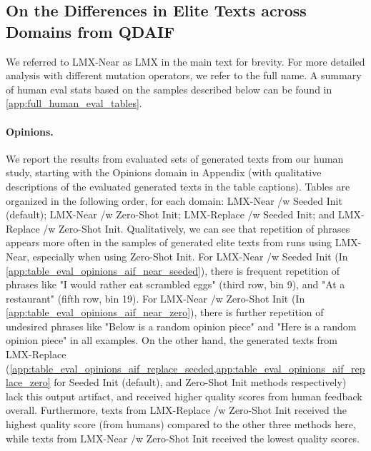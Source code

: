 

\clearpage
\newpage
\subsection{On the Differences in Elite Texts across Domains from QDAIF}\label{app:qualitative_summary_qdaif}
We referred to LMX-Near \citep{meyerson2023language} as LMX in the main text for brevity. For more detailed analysis with different mutation operators, we refer to the full name. A summary of human eval stats based on the samples described below can be found in \cref{app:full_human_eval_tables}.

\paragraph{Opinions.}
We report the results from evaluated sets of generated texts from our human study, starting with the Opinions domain in Appendix  (with qualitative descriptions of the evaluated generated texts in the table captions). Tables are organized in the following order, for each domain: LMX-Near /w Seeded Init (default); LMX-Near /w Zero-Shot Init; LMX-Replace /w Seeded Init; and LMX-Replace /w Zero-Shot Init. Qualitatively, we can see that repetition of phrases appears more often in the samples of generated elite texts from runs using LMX-Near, especially when using Zero-Shot Init. For LMX-Near /w Seeded Init (In \cref{app:table_eval_opinions_aif_near_seeded}), there is frequent repetition of phrases like "I would rather eat scrambled eggs" (third row, bin 9), and "At a restaurant" (fifth row, bin 19). For LMX-Near /w Zero-Shot Init (In \cref{app:table_eval_opinions_aif_near_zero}), there is further repetition of undesired phrases like "Below is a random opinion piece" and "Here is a random opinion piece" in all examples. On the other hand, the generated texts from LMX-Replace (\cref{app:table_eval_opinions_aif_replace_seeded,app:table_eval_opinions_aif_replace_zero} for Seeded Init (default), and Zero-Shot Init methods respectively) lack this output artifact, and received higher quality scores from human feedback overall. Furthermore, texts from LMX-Replace /w Zero-Shot Init received the highest quality score (from humans) compared to the other three methods here, while texts from LMX-Near /w Zero-Shot Init received the lowest quality scores.

